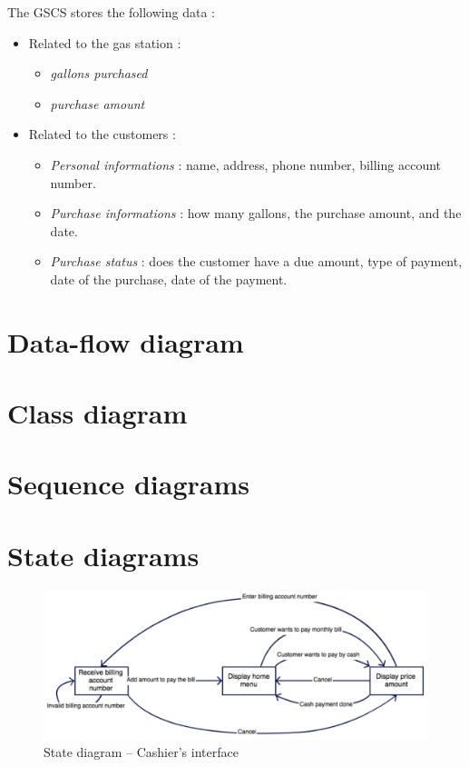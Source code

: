 \documentclass[11pt, a4paper]{article}
\newcommand{\data}[1]{\textit{#1}}
\begin{document}
The GSCS stores the following data :
\begin{itemize}
\item Related to the gas station :
		\begin{itemize}
		\item \data{gallons purchased}
		\item \data{purchase amount}
		\end{itemize}

\item Related to the customers :
		\begin{itemize}
		\item \data{Personal informations} : name, address, phone number, billing account number.
		\item \data{Purchase informations} : how many gallons, the purchase amount, and the date.
		\item \data{Purchase status} : does the customer have a due amount, type of payment, date of the purchase, date of the payment.
		\end{itemize}
\end{itemize}


\section{Data-flow diagram}

\section{Class diagram}

\section{Sequence diagrams}

\section{State diagrams}

\begin{figure}[h]
\centering
\includegraphics[width=\textwidth]{StateDiagram_Cashier_interface.pdf}
\caption{State diagram -- Cashier's interface}
\end{figure}
\end{document}
